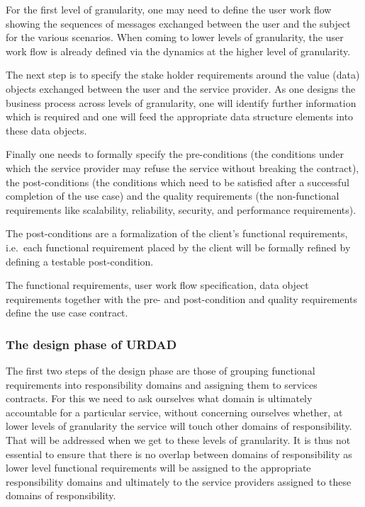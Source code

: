 For the first level of granularity, one may need to define the user work flow
showing the sequences of messages exchanged between the user and the subject
for the various scenarios. When coming to lower levels of granularity, the
user work flow is already defined via the dynamics at the higher level of
granularity.

The next step is to specify the stake holder requirements around the value
(data) objects exchanged between the user and the service provider. As one
designs the business process across levels of granularity, one will identify
further information which is required and one will feed the appropriate
data structure elements into these data objects.

Finally one needs to formally specify the pre-conditions (the conditions under
which the service provider may refuse the service without breaking the
contract), the post-conditions (the conditions which need to be satisfied after
a successful completion of the use case) and the quality requirements (the
non-functional requirements like scalability, reliability, security, and
performance requirements).

The post-conditions are a formalization of the client's functional requirements,
i.e.\ each functional requirement placed by the client will be formally refined
by defining a testable post-condition.

The functional requirements, user work flow specification, data object requirements
together with the pre- and post-condition and quality requirements define the
use case contract.


\subsubsection{The design phase of URDAD}

The first two steps of the design phase are those of grouping functional
requirements into responsibility domains and assigning them to services
contracts. For this we need to ask ourselves what domain is ultimately
accountable for a particular service, without concerning ourselves whether,
at lower levels of granularity the service will touch other domains of
responsibility. That will be addressed when we get to these levels of
granularity. It is thus not essential to ensure that
there is no overlap between domains of responsibility as
lower level functional requirements will be assigned to the appropriate responsibility
domains and ultimately to the service providers assigned to these domains of responsibility.


